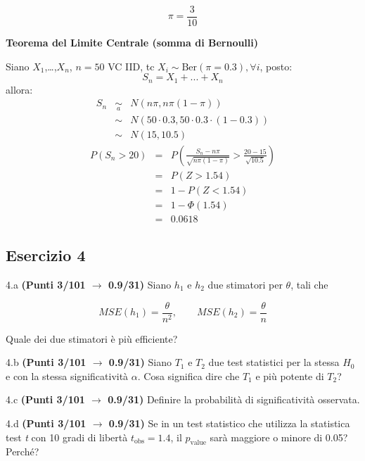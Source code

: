 \documentclass[
  11pt,
]{book}
\theoremstyle{mytheoremstyle}
\theoremstyle{mydefstyle}
\newenvironment{sol}
  {
  \begin{tcolorbox}[enhanced,breakable,arc=0.1mm,boxrule=1pt,colback=white,colframe=iblue,
  title=\bf \fontfamily{lmss}\selectfont \hspace{.5 cm} Soluzione,drop fuzzy shadow]

}{
\end{tcolorbox}
  }
\begin{document}
\begin{sol}
\[
\pi=\frac 3{10}
\]

\textbf{Teorema del Limite Centrale (somma di Bernoulli)}

Siano \(X_1\),\ldots,\(X_n\), \(n=50\) VC IID, tc \(X_i\sim\text{Ber}(\pi=0.3)\)\(,\forall i\), posto:
\[
      S_n = X_1 + ... + X_n
      \]
allora:\begin{eqnarray*}
  S_n & \mathop{\sim}\limits_{a}& N(n\pi,n\pi(1-\pi)) \\
      &\sim & N(50\cdot0.3,50\cdot0.3\cdot(1-0.3)) \\
      &\sim & N(15,10.5)
  \end{eqnarray*}\begin{eqnarray*}
      P( S_n   >   20 ) 
        &=& P\left(  \frac { S_n  -  n\pi }{ \sqrt{n\pi(1-\pi)} }  >  \frac { 20  -  15 }{\sqrt{ 10.5 }} \right)  \\
                 &=& P\left(  Z   >   1.54 \right) \\    &=& 1-P(Z< 1.54 )\\ 
                 &=&  1-\Phi( 1.54 ) \\ &=&  0.0618 
      \end{eqnarray*}

\end{sol}

\subsection{Esercizio 4}\label{esercizio-4-13}

4.a \textbf{(Punti 3/101 \(\rightarrow\) 0.9/31)} Siano \(h_1\) e \(h_2\) due stimatori per \(\theta\), tali che

\[
  MSE(h_1) =  \frac{\theta}{n^2}, \qquad  MSE(h_2) =  \frac{\theta}{n}
\]

Quale dei due stimatori è più efficiente?

4.b \textbf{(Punti 3/101 \(\rightarrow\) 0.9/31)} Siano \(T_1\) e \(T_2\) due test statistici per la stessa \(H_0\) e con la stessa significatività \(\alpha\). Cosa significa dire che \(T_1\) e più potente di \(T_2\)?

4.c \textbf{(Punti 3/101 \(\rightarrow\) 0.9/31)} Definire la probabilità di significatività osservata.

4.d \textbf{(Punti 3/101 \(\rightarrow\) 0.9/31)} Se in un test statistico che utilizza la statistica test \emph{t} con 10 gradi di libertà \(t_\text{obs}=1.4\), il \(p_\text{value}\) sarà maggiore o minore di 0.05? Perché?
\end{document}

